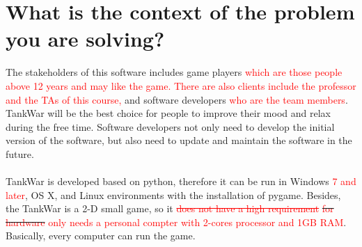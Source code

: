 \documentclass{article}
\begin{document}
\section{What is the context of the problem you are solving?}

The stakeholders of this software includes game players \textcolor{red}{which are those people above 12 years and may like the game. There are also clients include the professor and the TAs of this course, } and software developers \textcolor{red}{who are the team members}. TankWar will be the best choice for people to improve their mood and relax during the free time. Software developers not only need to develop the initial version of the software, but also need to update and maintain the software in the future. \\
\\
TankWar is developed based on python, therefore it can be run in Windows \textcolor{red}{7 and later}, OS X, and Linux environments with the installation of pygame. Besides, the TankWar is a 2-D small game, so it \textcolor{red}{\sout{does not have a high requirement}} \sout{\textcolor{red}{for hardware}} \textcolor{red}{only needs a personal compter with 2-cores processor and 1GB RAM}. Basically, every computer can run the game.
\end{document}
